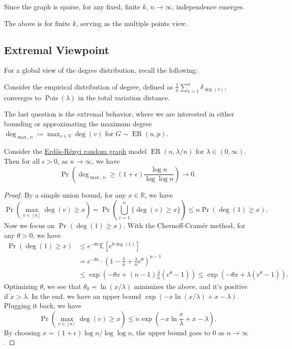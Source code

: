 \begin{intuition}
	Since the graph is sparse, for any fixed, finite \(k\),  \(n \to \infty \), independence emerges.
\end{intuition}

The above is for finite \(k\), serving as the multiple points view.

\subsection{Extremal Viewpoint}
For a global view of the degree distribution, recall the following:

\begin{prev}
	Consider the empirical distribution of degree, defined as \(\frac{1}{n} \sum_{v=1}^{n} \delta _{\deg(v)}\), converges to \(\operatorname{Pois}(\lambda ) \) in the total variation distance.
\end{prev}

The last question is the extremal behavior, where we are interested in either bounding or approximating the maximum degree \(\deg _{\max , n} \coloneqq \max _{v \in V} \deg (v)\) for \(G \sim \operatorname{ER}(n, p)\).

\begin{proposition}\label{prop:Erdős-Rényi-max-degree}
	Consider the \hyperref[def:Erdős-Rényi-random-graph]{Erdős-Rényi random graph} model \(\operatorname{ER}(n, \lambda / n)\) for \(\lambda \in (0, \infty )\). Then for all \(\epsilon > 0\), as \(n \to \infty \), we have
	\[
		\Pr_{}\left( \deg _{\max , n} \geq (1 + \epsilon ) \frac{\log n}{\log \log n} \right)
		\to 0.
	\]
\end{proposition}
\begin{proof}
	By a simple union bound, for any \(x \in \mathbb{R} \), we have
	\[
		\Pr_{}\left( \max _{v \in [n]} \deg (v) \geq x\right)
		= \Pr_{}\left( \bigcup_{v=1}^{n} \{ \deg (v) \geq x \} \right)
		\leq n \Pr_{}(\deg (1) \geq x) .
	\]
	Now we focus on \(\Pr_{}(\deg (1) \geq x) \). With the Chernoff-Cramér method, for any \(\theta > 0\), we have
	\begin{align*}
		\Pr_{}(\deg (1) \geq x)
		 & \leq e^{-\theta x} \mathbb{E}_{}[e^{\theta \deg (1)}]                                             \\
		 & = e^{-\theta x} \cdot \left( 1 - \frac{\lambda}{n} + \frac{\lambda}{n} e^{\theta } \right) ^{n-1} \\
		 & \leq \exp (-\theta x + (n-1) \frac{\lambda}{n} (e^\theta - 1))
		\leq \exp (-\theta x + \lambda (e^\theta - 1)). \tag*{(\(1 + t \leq e^t\))}
	\end{align*}
	Optimizing \(\theta \), we see that \(\theta _0 = \ln (x / \lambda )\) minimizes the above, and it's positive if \(x > \lambda \). In the end, we have an upper bound \(\exp (-x \ln (x / \lambda ) + x - \lambda )\). Plugging it back, we have
	\[
		\Pr_{}\left( \max _{v \in [n]} \deg (v) \geq x\right)
		\leq n \exp (- x \ln \frac{x}{\lambda } + x - \lambda ).
	\]
	By choosing \(x = (1 + \epsilon ) \log n / \log \log n\), the upper bound goes to \(0\) as \(n \to \infty \).
\end{proof}

